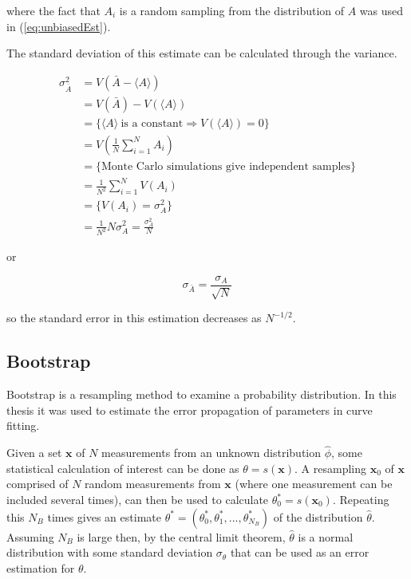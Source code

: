 where the fact that $A_i$ is a random sampling from the distribution of $A$ was used in (\ref{eq:unbiasedEst}).

The standard deviation of this estimate can be calculated through the variance.

\begin{align}
    \sigma_{\bar A}^{2} &= V\left( \bar A - \langle A \rangle \right ) \\
%
    &= V\left(\bar A\right) - V\left(\langle A \rangle\right) \\
%
    &= \{ \langle A \rangle \ \text{is a constant} \Rightarrow V(\langle A \rangle) = 0 \} \\
%
    &= V \left ( \frac{1}{N} \sum_{i = 1}^{N} A_i \right ) \\
%
    &= \{ \text{Monte Carlo simulations give independent samples} \} \\
%
    &= \frac{1}{N^2} \sum_{i = 1}^{N} V(A_i) \\
%
    &= \{ V(A_i) = \sigma_{A}^2 \} \\
%
    &= \frac{1}{N^2} N \sigma_{A}^2 = \frac{\sigma_{A}^2}{N}
\end{align}

or

\begin{equation}
    \sigma_{\bar A} = \frac{\sigma_A}{\sqrt{N}}
\end{equation}

so the standard error in this estimation decreases as $N^{-1/2}$.

\subsection{Bootstrap}
\label{subsec:Bootstrap}

Bootstrap is a resampling method to examine a probability distribution. In this thesis it was used to estimate the error propagation of parameters in curve fitting.

Given a set $\bm x$ of $N$ measurements from an unknown distribution $\hat \phi$, some statistical calculation of interest can be done as $\theta = s(\bm x)$. A resampling $\bm x_0$ of $\bm x$ comprised of $N$ random measurements from $\bm x$ (where one measurement can be included several times), can then be used to calculate $\theta^*_0 = s(\bm x_0)$. Repeating this $N_B$ times gives an estimate $\theta^* = (\theta^*_0, \theta^*_1, ..., \theta^*_{N_B})$ of the distribution $\hat \theta$. Assuming $N_B$ is large then, by the central limit theorem, $\hat \theta$ is a normal distribution with some standard deviation $\sigma_\theta$ that can be used as an error estimation for $\theta$.

